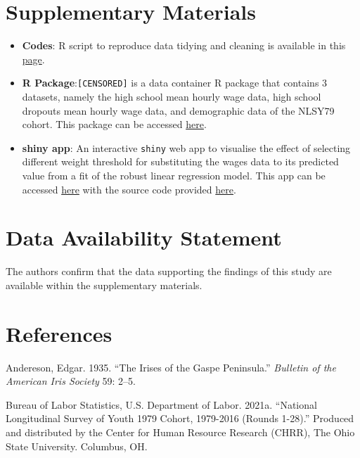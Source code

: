 \documentclass{article}
\begin{document}
\hypertarget{supplementary-materials}{%
\section{Supplementary Materials}\label{supplementary-materials}}

\begin{itemize}
\item
  \textbf{Codes}: R script to reproduce data tidying and cleaning is available in this \href{CENSORED/articles/process-data.html}{page}.
\item
  \textbf{R Package}:\texttt{[CENSORED]} is a data container R package that contains 3 datasets, namely the high school mean hourly wage data, high school dropouts mean hourly wage data, and demographic data of the NLSY79 cohort. This package can be accessed \href{CENSORED}{here}.
\item
  \textbf{shiny app}: An interactive \texttt{shiny} web app to visualise the effect of selecting different weight threshold for substituting the wages data to its predicted value from a fit of the robust linear regression model. This app can be accessed \href{CENSORED}{here} with the source code provided \href{CENSORED/tree/master/app}{here}.
\end{itemize}

\hypertarget{data-availability-statement}{%
\section{Data Availability Statement}\label{data-availability-statement}}

The authors confirm that the data supporting the findings of this study are available within the supplementary materials.

\hypertarget{references}{%
\section*{References}\label{references}}

\hypertarget{refs}{}
\leavevmode\hypertarget{ref-iris-data}{}%
Andereson, Edgar. 1935. ``The Irises of the Gaspe Peninsula.'' \emph{Bulletin of the American Iris Society} 59: 2--5.

\leavevmode\hypertarget{ref-nlsy79}{}%
Bureau of Labor Statistics, U.S. Department of Labor. 2021a. ``National Longitudinal Survey of Youth 1979 Cohort, 1979-2016 (Rounds 1-28).'' Produced and distributed by the Center for Human Resource Research (CHRR), The Ohio State University. Columbus, OH.
\end{document}
